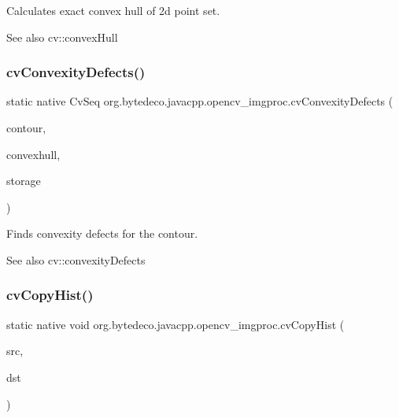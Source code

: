 Calculates exact convex hull of 2d point set. 

\begin{DoxySeeAlso}{See also}
cv\+::convex\+Hull 
\end{DoxySeeAlso}
\mbox{\label{group__imgproc__c_ga186461d20f3b430d538560470ed76ea1}} 
\subsubsection{\texorpdfstring{cv\+Convexity\+Defects()}{cvConvexityDefects()}}
{\footnotesize\ttfamily static native Cv\+Seq org.\+bytedeco.\+javacpp.\+opencv\+\_\+imgproc.\+cv\+Convexity\+Defects (\begin{DoxyParamCaption}\item[{@Const Cv\+Arr}]{contour,  }\item[{@Const Cv\+Arr}]{convexhull,  }\item[{Cv\+Mem\+Storage}]{storage }\end{DoxyParamCaption})\hspace{0.3cm}{\ttfamily [static]}}



Finds convexity defects for the contour. 

\begin{DoxySeeAlso}{See also}
cv\+::convexity\+Defects 
\end{DoxySeeAlso}
\mbox{\label{group__imgproc__c_ga8d6e92f294d7853bc6a9435443b56c5d}} 
\subsubsection{\texorpdfstring{cv\+Copy\+Hist()}{cvCopyHist()}}
{\footnotesize\ttfamily static native void org.\+bytedeco.\+javacpp.\+opencv\+\_\+imgproc.\+cv\+Copy\+Hist (\begin{DoxyParamCaption}\item[{@Const Cv\+Histogram}]{src,  }\item[{@Cast(\char`\"{}Cv\+Histogram$\ast$$\ast$\char`\"{}) Pointer\+Pointer}]{dst }\end{DoxyParamCaption})\hspace{0.3cm}{\ttfamily [static]}}



